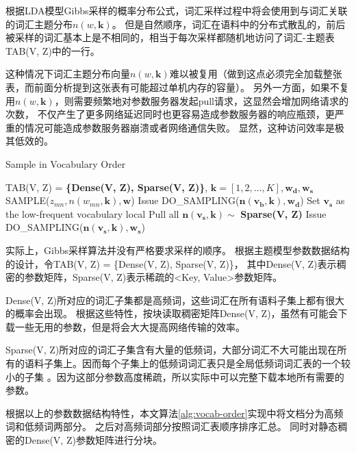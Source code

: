 根据LDA模型Gibbs采样的概率分布公式，词汇采样过程中将会使用到与词汇关联的词汇主题分布$n(w, \mathbf{k})$。
但是自然顺序，词汇在语料中的分布式散乱的，前后被采样的词汇基本上是不相同的，相当于每次采样都随机地访问了词汇-主题表TAB(V, Z)中的一行。

这种情况下词汇主题分布向量$n(w, \mathbf{k})$难以被复用（做到这点必须完全加载整张表，而前面分析提到这张表有可能超过单机内存的容量）。
另外一方面，如果不复用$n(w, \mathbf{k})$，则需要频繁地对参数服务器发起pull请求，这显然会增加网络请求的次数，
不仅产生了更多网络延迟同时也更容易造成参数服务器的响应瓶颈，更严重的情况可能造成参数服务器崩溃或者网络通信失败。
显然，这种访问效率是极其低效的。

\begin{algorithm}[htb]
\caption{Sample in Vocabulary Order} 
\label{alg:vocab-order}
\begin{algorithmic}[1]
\Require TAB(V, Z) = \textbf{\{Dense(V, Z), Sparse(V, Z)\}}, $\mathbf{k} = [1, 2, ..., K], \mathbf{w_d, w_s}$
\State SAMPLE($z_{mn}, n(w_{mn}, \mathbf{k}), \mathbf{w}$)
\EndFor
\EndFor
\EndFunction
{}
\State Issue DO\_SAMPLING($\mathbf{n(v_b, k), w_d}$)
\EndFor
\State Set $\mathbf{v_s}$ as the low-frequent vocabulary local
\State Pull all $\mathbf{n(v_s, k)} \sim $ \textbf{Sparse(V, Z)}
\State Issue DO\_SAMPLING($\mathbf{n(v_s, k), w_s}$)
\end{algorithmic}  
\end{algorithm}  

实际上，Gibbs采样算法并没有严格要求采样的顺序。
根据主题模型参数数据结构的设计，令TAB(V, Z) = \{Dense(V, Z), Sparse(V, Z)\}，
其中Dense(V, Z)表示稠密的参数矩阵，Sparse(V, Z)表示稀疏的<Key, Value>参数矩阵。

Dense(V, Z)所对应的词汇子集都是高频词，这些词汇在所有语料子集上都有很大的概率会出现。
根据这些特性，按块读取稠密矩阵Dense(V, Z)，虽然有可能会下载一些无用的参数，但是将会大大提高网络传输的效率。

Sparse(V, Z)所对应的词汇子集含有大量的低频词，大部分词汇不大可能出现在所有的语料子集上。因而每个子集上的低频词词汇表只是全局低频词词汇表的一个较小的子集
。因为这部分参数高度稀疏，所以实际中可以完整下载本地所有需要的参数。

根据以上的参数数据结构特性，本文算法\ref{alg:vocab-order}实现中将文档分为高频词和低频词两部分。
之后对高频词部分按照词汇表顺序排序汇总。
同时对静态稠密的Dense(V, Z)参数矩阵进行分块。

